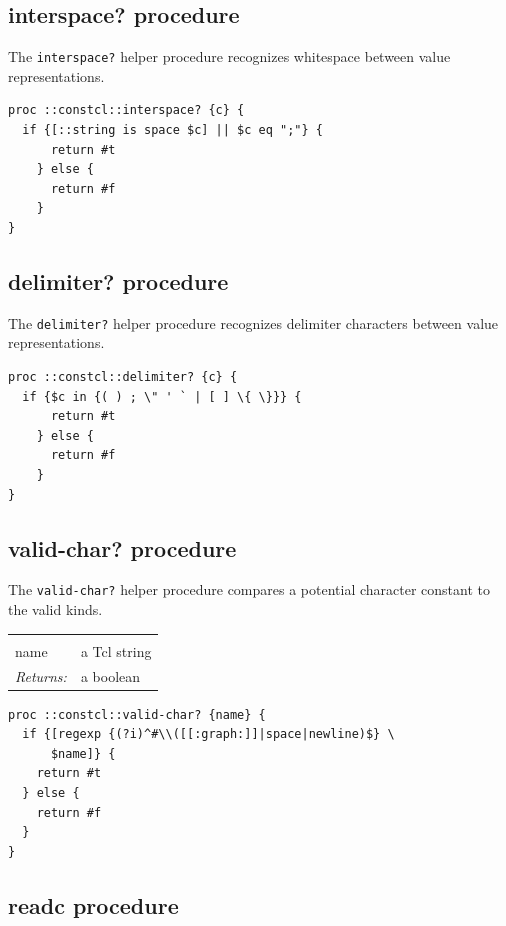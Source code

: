 \documentclass[twoside,9pt]{report}
\begin{document}
\subsection{interspace? procedure}
\label{interspace?-procedure}


The \texttt{interspace?} helper procedure recognizes whitespace between value representations.

\begin{lstlisting}
proc ::constcl::interspace? {c} {
  if {[::string is space $c] || $c eq ";"} {
      return #t
    } else {
      return #f
    }
}
\end{lstlisting}
\subsection{delimiter? procedure}
\label{delimiter?-procedure}


The \texttt{delimiter?} helper procedure recognizes delimiter characters between value representations.

\begin{lstlisting}
proc ::constcl::delimiter? {c} {
  if {$c in {( ) ; \" ' ` | [ ] \{ \}}} {
      return #t
    } else {
      return #f
    }
}
\end{lstlisting}
\subsection{valid-char? procedure}
\label{valid-char?-procedure}


The \texttt{valid-char?} helper procedure compares a potential character constant to the valid kinds.

\noindent\begin{tabular}{ |p{1.9cm} p{8cm}| }
\hline
\rowcolor[HTML]{CCCCCC} \multicolumn{2}{|l|}{\bf valid-char? (internal)} \\
name & a Tcl string \\
\textit{Returns:} & a boolean \\
\hline
\end{tabular}
\begin{lstlisting}
proc ::constcl::valid-char? {name} {
  if {[regexp {(?i)^#\\([[:graph:]]|space|newline)$} \
      $name]} {
    return #t
  } else {
    return #f
  }
}
\end{lstlisting}
\subsection{readc procedure}
\label{readc-procedure}
\end{document}
